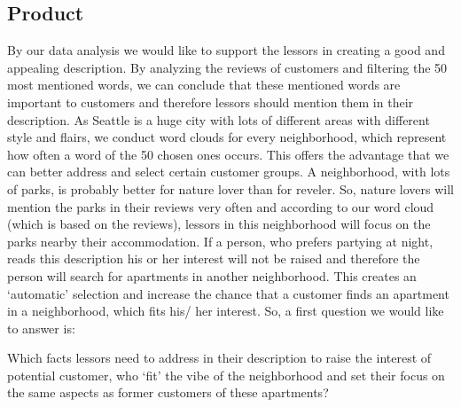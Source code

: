 \documentclass[journal]{IEEEtran}
\begin{document}
\subsection{Product}
\noindent By our data analysis we would like to support the lessors in creating a good and appealing description. By analyzing the reviews of customers and filtering the 50 most mentioned words, we can conclude that these mentioned words are important to customers and therefore lessors should mention them in their description. As Seattle is a huge city with lots of different areas with different style and flairs, we conduct word clouds for every neighborhood, which represent how often a word of the 50 chosen ones occurs. This offers the advantage that we can better address and select certain customer groups. A neighborhood, with lots of parks, is probably better for nature lover than for reveler. So, nature lovers will mention the parks in their reviews very often and according to our word cloud (which is based on the reviews), lessors in this neighborhood will focus on the parks nearby their accommodation. If a person, who prefers partying at night, reads this description his or her interest will not be raised and therefore the person will search for apartments in another neighborhood. This creates an ‘automatic’ selection and increase the chance that a customer finds an apartment in a neighborhood, which fits his/ her interest. So, a first question we would like to answer is: \begin{itshape}Which facts lessors need to address in their description to raise the interest of potential customer, who ‘fit’ the vibe of the neighborhood and set their focus on the same aspects as former customers of these apartments?\end{itshape}
\end{document}
